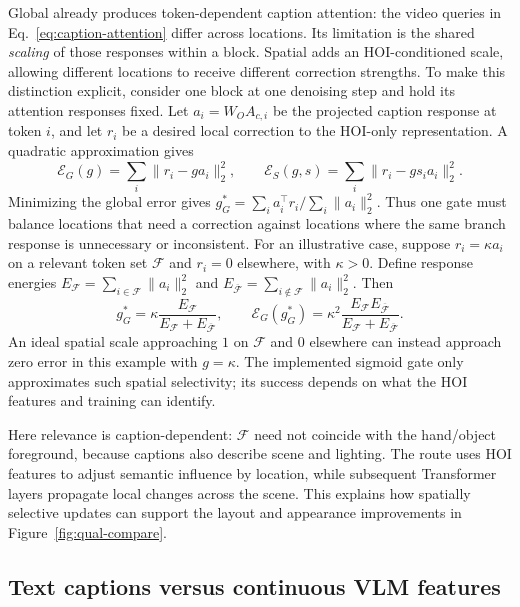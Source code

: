 \documentclass{article} %
\begin{document}
Global already produces token-dependent caption attention: the video
queries in Eq.~\ref{eq:caption-attention} differ across locations.
Its limitation is the shared \emph{scaling} of those responses within a
block. Spatial adds an HOI-conditioned scale, allowing different locations
to receive different correction strengths. To make this distinction
explicit, consider one block at one denoising step and hold its attention
responses fixed. Let $a_i=W_O A_{c,i}$ be the projected caption response
at token $i$, and let $r_i$ be a desired local correction to the
HOI-only representation. A quadratic approximation gives
\begin{equation}
\mathcal E_G(g)=\sum_i\|r_i-ga_i\|_2^2,\qquad
\mathcal E_S(g,s)=\sum_i\|r_i-gs_i a_i\|_2^2.
\label{eq:routing-local-error}
\end{equation}
Minimizing the global error gives
$g_G^*=\sum_i a_i^\top r_i/\sum_i\|a_i\|_2^2$.
Thus one gate must balance locations that need a correction against
locations where the same branch response is unnecessary or inconsistent.
For an illustrative case, suppose $r_i=\kappa a_i$ on a relevant token set
$\mathcal F$ and $r_i=0$ elsewhere, with $\kappa>0$. Define response energies
$E_{\mathcal F}=\sum_{i\in\mathcal F}\|a_i\|_2^2$ and
$E_{\overline{\mathcal F}}=\sum_{i\notin\mathcal F}\|a_i\|_2^2$. Then
\begin{equation}
g_G^*=\kappa\frac{E_{\mathcal F}}
{E_{\mathcal F}+E_{\overline{\mathcal F}}},\qquad
\mathcal E_G(g_G^*)=\kappa^2
\frac{E_{\mathcal F}E_{\overline{\mathcal F}}}
{E_{\mathcal F}+E_{\overline{\mathcal F}}}.
\label{eq:routing-dilution}
\end{equation}
An ideal spatial scale approaching $1$ on $\mathcal F$ and $0$ elsewhere
can instead approach zero error in this example with $g=\kappa$.
The implemented sigmoid gate only approximates such spatial selectivity;
its success depends on what the HOI features and training can identify.

Here relevance is caption-dependent: $\mathcal F$ need not coincide with
the hand/object foreground, because captions also describe scene and
lighting. The route uses HOI features to adjust semantic influence by location,
while subsequent Transformer layers propagate local changes across the
scene. This explains how spatially selective updates can support the layout
and appearance improvements in Figure~\ref{fig:qual-compare}.

\subsection{Text captions versus continuous VLM features}
\label{sec:modality-eval}
\end{document}
